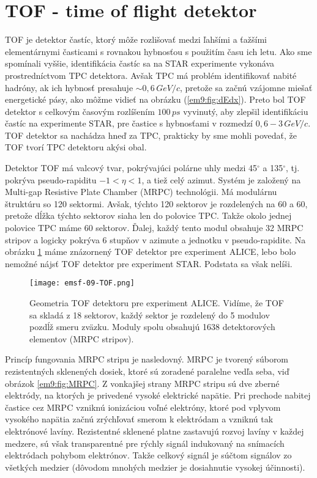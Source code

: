 \documentclass[../../main.tex]{subfiles}
\begin{document}
\section{TOF - time of flight detektor}
TOF je detektor častíc, ktorý môže rozlišovať medzi ľahšími a ťažšími elementárnymi časticami s rovnakou hybnosťou s použitím času ich letu.
Ako sme spomínali vyššie, identifikácia častíc sa na STAR experimente vykonáva prostredníctvom TPC detektora. Avšak TPC má problém identifikovať nabité hadróny, ak ich hybnosť presahuje $\sim 0,6\,\unit{GeV}/c$, pretože sa začnú vzájomne miešať energetické pásy, ako môžme vidieť na obrázku (\ref{em9:fig:dEdx}). Preto bol TOF detektor s celkovým časovým rozlíšením $100\,\unit{ps}$ vyvinutý, aby zlepšil identifikáciu častíc na experimente STAR, pre častice s hybnosťami v rozmedzí $0,6-3\,\unit{GeV}/c$. TOF detektor sa nachádza hneď za TPC, prakticky by sme mohli povedať, že TOF tvorí TPC detektoru akýsi obal.

Detektor TOF má valcový tvar, pokrývajúci polárne uhly medzi 45$^\circ$ a 135$^\circ$, tj. pokrýva pseudo-rapiditu $-1 < \eta < 1$, a tiež celý azimut. Systém je založený na Multi-gap Resistive Plate Chamber (MRPC) technológii. Má modulárnu štruktúru so 120 sektormi. Avšak, týchto 120 sektorov je rozdelených na 60 a 60, pretože dĺžka týchto sektorov siaha len do polovice TPC. Takže okolo jednej polovice TPC máme 60 sektorov. Ďalej, každý tento modul obsahuje 32 MRPC stripov a logicky pokrýva 6 stupňov v azimute a jednotku v pseudo-rapidite. Na obrázku \ref{em9:fig:TOF} máme znázornený TOF detektor pre experiment ALICE, lebo bolo nemožné nájsť TOF detektor pre experiment STAR. Podstata sa však nelíši.

\begin{figure}[!h]
\texttt{[image: emsf-09-TOF.png]}
\centering
\caption{Geometria TOF detektoru pre experiment ALICE. Vidíme, že TOF sa skladá z 18 sektorov, každý sektor je rozdelený do 5 modulov pozdĺž smeru zväzku. Moduly spolu obsahujú 1638 detektorových elementov (MRPC stripov).}
\label{em9:fig:TOF}
\end{figure}

Princíp fungovania MRPC stripu je nasledovný. MRPC je tvorený súborom rezistentných sklenených dosiek, ktoré sú zoradené paralelne vedľa seba, viď obrázok \ref{em9:fig:MRPC}. Z vonkajšej strany MRPC stripu sú dve zberné elektródy, na ktorých je privedené vysoké elektrické napätie. Pri prechode nabitej častice cez MRPC vzniknú ionizáciou voľné elektróny, ktoré pod vplyvom vysokého napätia začnú zrýchľovať smerom k elektródam a vzniknú tak elektrónové lavíny. Rezistentné sklenené platne zastavujú rozvoj lavíny v každej medzere, sú však transparentné pre rýchly signál indukovaný na snímacích elektródach pohybom elektrónov. Takže celkový signál je súčtom signálov zo všetkých medzier (dôvodom mnohých medzier je dosiahnutie vysokej účinnosti).
\end{document}
